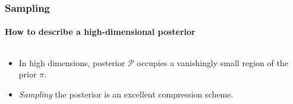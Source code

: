 \documentclass[%
]{beamer}
\newcommand{\posterior}{\mathcal{P}}
\newcommand{\prior}{\pi}
\begin{document}
\begin{frame}
    \frametitle{Sampling}
    \framesubtitle{How to describe a high-dimensional posterior}

	\begin{columns}
	\begin{column}{0.5\textwidth}
		\begin{itemize}
          \item<3-> In high dimensions, posterior $\posterior$ occupies a vanishingly small region of the prior $\prior$.
          \item<4-> {\em Sampling\/} the posterior is an excellent compression scheme.
		\end{itemize}
	\end{column}
	\begin{column}{0.5\textwidth}
	\end{column}
	\end{columns}
 
\end{frame}

\end{document}
